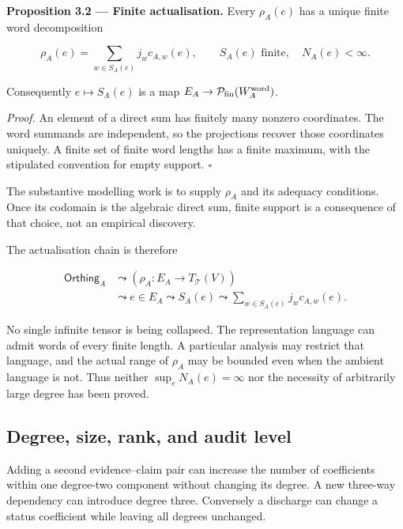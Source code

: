 \documentclass[11pt,a4paper]{article}
\begin{document}

\textbf{Proposition 3.2 --- Finite actualisation.} Every \(\rho_A(e)\)
has a unique finite word decomposition

\nopagebreak[4]

\[
\rho_A(e)=\sum_{w\in S_A(e)}j_w c_{A,w}(e),
\qquad S_A(e)\text{ finite},\quad N_A(e)<\infty.
\]

Consequently \(e\mapsto S_A(e)\) is a map
\(E_A\to\mathcal P_{\rm fin}(W_A^{\rm word})\).

\emph{Proof.} An element of a direct sum has finitely many nonzero
coordinates. The word summands are independent, so the projections
recover those coordinates uniquely. A finite set of finite word lengths
has a finite maximum, with the stipulated convention for empty support.
\(\square\)

The substantive modelling work is to supply \(\rho_A\) and its adequacy
conditions. Once its codomain is the algebraic direct sum, finite
support is a consequence of that choice, not an empirical discovery.

The actualisation chain is therefore

\nopagebreak[4]

\[
\begin{aligned}
\mathsf{Orthing}_A
&\leadsto (\rho_A:E_A\to T_{\mathcal T}(V))\\
&\leadsto e\in E_A
\leadsto S_A(e)
\leadsto\sum_{w\in S_A(e)}j_wc_{A,w}(e).
\end{aligned}
\]

No single infinite tensor is being collapsed. The representation
language can admit words of every finite length. A particular analysis
may restrict that language, and the actual range of \(\rho_A\) may be
bounded even when the ambient language is not. Thus neither
\(\sup_eN_A(e)=\infty\) nor the necessity of arbitrarily large degree
has been proved.

\subsection{Degree, size, rank, and audit
level}\label{degree-size-rank-and-audit-level}

Adding a second evidence--claim pair can increase the number of
coefficients within one degree-two component without changing its
degree. A new three-way dependency can introduce degree three.
Conversely a discharge can change a status coefficient while leaving all
degrees unchanged.
\end{document}
